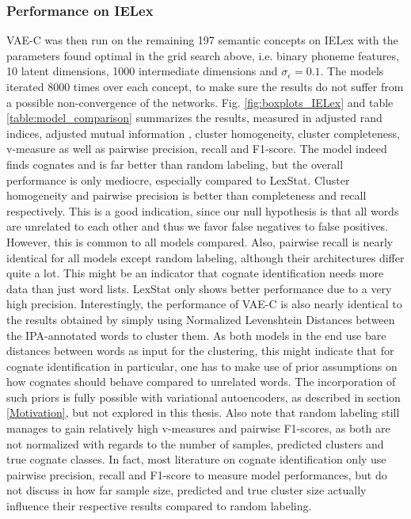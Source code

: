 \documentclass[6pt]{article}
\begin{document}
\subsubsection{Performance on IELex}

VAE-C was then run on the remaining 197 semantic concepts on IELex with the parameters found optimal in the grid search above, i.e. binary phoneme features, 10 latent dimensions, 1000 intermediate dimensions and $\sigma_{\epsilon}= 0.1$. The models iterated 8000 times over each concept, to make sure the results do not suffer from a possible non-convergence of the networks.   Fig. \ref{fig:boxplots_IELex} and table \ref{table:model_comparison} summarizes the results, measured in adjusted rand indices, adjusted mutual information \citep{vinh2010information}, cluster homogeneity, cluster completeness, v-measure \citep{rosenberg2007v} as well as pairwise precision, recall and F1-score.
The model indeed finds cognates and is far better than random labeling, but the overall performance is only mediocre, especially compared to LexStat. Cluster homogeneity and pairwise precision is better than completeness and recall respectively. This is a good indication, since our null hypothesis is that all words are unrelated to each other and thus we favor false negatives to false positives.  However, this is common to all models compared. Also, pairwise recall is nearly identical for all models except random labeling, although their architectures differ quite a lot. This might be an indicator that cognate identification needs more data than just word lists. LexStat only shows better performance due to a very high precision.  
Interestingly, the performance of VAE-C is also nearly identical to the results obtained by simply using Normalized Levenshtein Distances between the IPA-annotated words to cluster them. As both models in the end use bare distances between words as input for the clustering, this might indicate that for cognate identification in particular, one has to make use of prior assumptions on how cognates should behave compared to unrelated words. The incorporation of such priors is fully possible with variational autoencoders, as described in section \ref{Motivation}, but not explored in this thesis. 
Also note that random labeling still manages to gain relatively high v-measures and pairwise F1-scores, as both are not normalized with regards to the number of samples, predicted clusters and true cognate classes. In fact, most literature on cognate identification \citep{mackay2005computing,list2012lexstat,wahle2013alignment,rama2016siamese} only use pairwise precision, recall and F1-score to measure model performances, but do not discuss in how far sample size, predicted and true cluster size actually influence their respective results compared to random labeling. 
\end{document}
